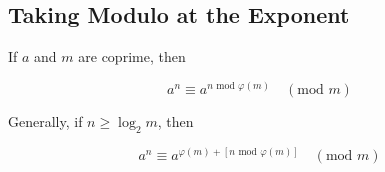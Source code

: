 \subsection{Taking Modulo at the Exponent}

If $a$ and $m$ are coprime, then

$$ a^n \equiv a^{n \text{ mod } \varphi(m)} \quad (\text{mod } m) $$

Generally, if $n \geq \log_2 m$, then

$$ a^n \equiv a^{\varphi(m) + [n \text{ mod } \varphi(m)]} \quad (\text{mod } m) $$
